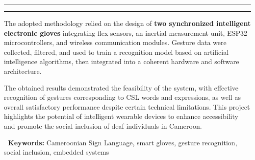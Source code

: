 \documentclass[11pt,a4paper]{report}
\newcommand{\concept}[1]{\textcolor{harmonyPrimary}{\textbf{#1}}}
\newcommand{\elegantsep}{\begin{center}\vspace{10pt}\textcolor{harmonyGray300}{\rule{0.2\textwidth}{0.5pt}\hspace{10pt}\textcolor{harmonyAccent}{\faDiamond}\hspace{10pt}\rule{0.2\textwidth}{0.5pt}}\vspace{10pt}\end{center}}
\begin{document}
\elegantsep

The adopted methodology relied on the design of \concept{two synchronized intelligent electronic gloves} integrating flex sensors, an inertial measurement unit, ESP32 microcontrollers, and wireless communication modules. Gesture data were collected, filtered, and used to train a recognition model based on artificial intelligence algorithms, then integrated into a coherent hardware and software architecture.

The obtained results demonstrated the feasibility of the system, with effective recognition of gestures corresponding to CSL words and expressions, as well as overall satisfactory performance despite certain technical limitations. This project highlights the potential of intelligent wearable devices to enhance accessibility and promote the social inclusion of deaf individuals in Cameroon.

\begin{processbox}
\textbf{\textcolor{harmonyPrimary}{\faTags\ Keywords:}} Cameroonian Sign Language, smart gloves, gesture recognition, social inclusion, embedded systems
\end{processbox}

\newpage
\tableofcontents
\newpage
\listoffigures
\newpage
\listoftables

\end{document}
